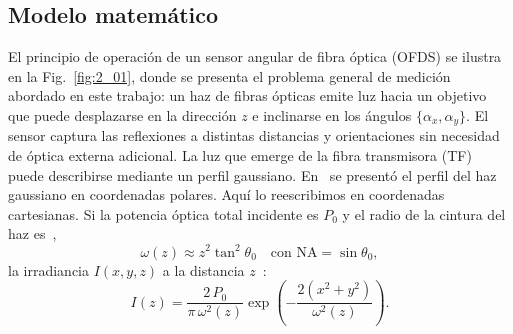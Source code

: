 \documentclass[11pt,a4paper]{article}
\begin{document}
\begin{multicols}{2}
\section{Modelo matemático}
\label{sec:5_01}
\noindent El principio de operación de un sensor angular de fibra óptica (OFDS) se ilustra en la Fig.~\ref{fig:2_01}, donde se presenta el problema general de medición abordado en este trabajo: un haz de fibras ópticas emite luz hacia un objetivo que puede desplazarse en la dirección $z$ e inclinarse en los ángulos $\{\alpha_x,\alpha_y\}$. El sensor captura las reflexiones a distintas distancias y orientaciones sin necesidad de óptica externa adicional. La luz que emerge de la fibra transmisora (TF) puede describirse mediante un perfil gaussiano. En~\cite{zubia_depth_2024} se presentó el perfil del haz gaussiano en coordenadas polares. Aquí lo reescribimos en coordenadas cartesianas. Si la potencia óptica total incidente es $P_0$ y el radio de la cintura del haz es~\cite{zubia_new_2024},
\begin{equation}
    \omega(z)\approx z^2\tan^2\theta_0\quad \text{con } \mathrm{NA} = \sin\theta_0,
\end{equation}
la irradiancia $I(x,y,z)$ a la distancia $z$~\cite{zubia_mathematical_2024,zubia_theoretical_2024}:
\begin{equation}
    I(z)= \frac{2\,P_0}{\pi\,\omega^2(z)}\exp\!\left(-\frac{2(x^2 + y^2)}{\omega^2(z)}\right).
    \label{eq:equ1}
\end{equation}

\end{multicols}
\end{document}
